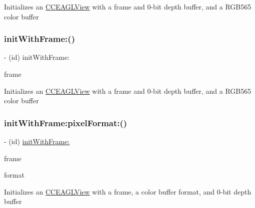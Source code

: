 Initializes an \hyperlink{interfaceCCEAGLView}{C\+C\+E\+A\+G\+L\+View} with a frame and 0-\/bit depth buffer, and a R\+G\+B565 color buffer \mbox{\label{interfaceCCEAGLView_a7d569f8fad8006eaa02d9b60f3877e43}} 
\subsubsection{\texorpdfstring{init\+With\+Frame\+:()}{initWithFrame:()}\hspace{0.1cm}{\footnotesize\ttfamily [2/2]}}
{\footnotesize\ttfamily -\/ (id) init\+With\+Frame\+: \begin{DoxyParamCaption}\item[{(C\+G\+Rect)}]{frame }\end{DoxyParamCaption}}

Initializes an \hyperlink{interfaceCCEAGLView}{C\+C\+E\+A\+G\+L\+View} with a frame and 0-\/bit depth buffer, and a R\+G\+B565 color buffer \mbox{\label{interfaceCCEAGLView_ad2edc9a56bec3887260f222686111d34}} 
\subsubsection{\texorpdfstring{init\+With\+Frame\+:pixel\+Format\+:()}{initWithFrame:pixelFormat:()}\hspace{0.1cm}{\footnotesize\ttfamily [1/2]}}
{\footnotesize\ttfamily -\/ (id) \hyperlink{interfaceCCEAGLView_a7d569f8fad8006eaa02d9b60f3877e43}{init\+With\+Frame\+:} \begin{DoxyParamCaption}\item[{(C\+G\+Rect)}]{frame }\item[{pixelFormat:(N\+S\+String$\ast$)}]{format }\end{DoxyParamCaption}}

Initializes an \hyperlink{interfaceCCEAGLView}{C\+C\+E\+A\+G\+L\+View} with a frame, a color buffer format, and 0-\/bit depth buffer \mbox{\label{interfaceCCEAGLView_ad2edc9a56bec3887260f222686111d34}} 
